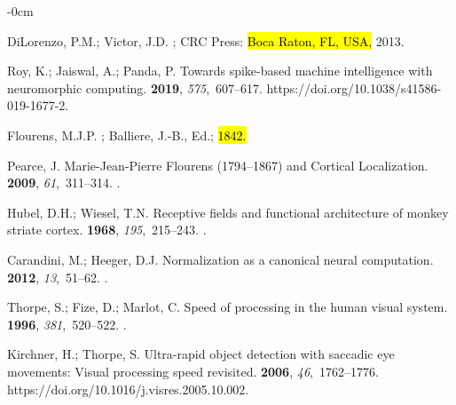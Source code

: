 \documentclass[brainsci, %
               review,accept,pdftex,moreauthors
               ]{Definitions/mdpi}
\begin{document}
\begin{adjustwidth}{-\extralength}{0cm}
\begin{thebibliography}{999}
DiLorenzo, P.M.; Victor, J.D.
; CRC Press:  \hl{Boca Raton, FL, USA,} %
  2013.


Roy, K.; Jaiswal, A.; Panda, P.
\newblock Towards spike-based machine intelligence with neuromorphic computing.
 {\bf 2019}, {\em 575},~607--617.
  {{https://doi.org/10.1038/s41586-019-1677-2}}.

Flourens, M.J.P.
; Balliere, J.-B., Ed.;  \hl{1842.} %


Pearce, J.
\newblock Marie-{Jean}-{Pierre} {Flourens} (1794--1867) and {Cortical}
  {Localization}.
 {\bf 2009}, {\em 61},~311--314.\linebreak
{}.

Hubel, D.H.; Wiesel, T.N.
\newblock Receptive fields and functional architecture of monkey striate
  cortex.
 {\bf 1968}, {\em 195},~215--243.
.

Carandini, M.; Heeger, D.J.
\newblock Normalization as a canonical neural computation.
 {\bf 2012}, {\em 13},~51--62.
.

Thorpe, S.; Fize, D.; Marlot, C.
\newblock Speed of processing in the human visual system.
 {\bf 1996}, {\em 381},~520--522.\linebreak
{}.

Kirchner, H.; Thorpe, S.
\newblock Ultra-rapid object detection with saccadic eye movements: {Visual}
  processing speed revisited.
 {\bf 2006}, {\em 46},~1762--1776.
  {{https://doi.org/10.1016/j.visres.2005.10.002}}.


\end{thebibliography}
\end{adjustwidth}
\end{document}
